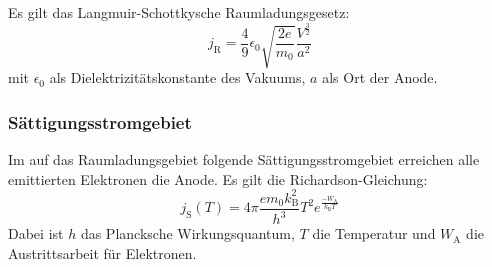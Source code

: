 Es gilt das Langmuir-Schottkysche Raumladungsgesetz:
\begin{equation}
  j_\mathrm{R}=\frac{4}{9} \epsilon_0 \sqrt{\frac{2e}{m_0}}\frac{V^{\frac{3}{2}}}{a^2}
\end{equation}
mit $\epsilon_0$ als Dielektrizitätskonstante des Vakuums, $a$ als Ort der Anode.

\subsubsection{Sättigungsstromgebiet}
Im auf das Raumladungsgebiet folgende Sättigungsstromgebiet erreichen alle emittierten Elektronen die Anode. Es gilt die Richardson-Gleichung:
\begin{equation}
j_\mathrm{S}(T)=4\pi\frac{e m_0 k_\mathrm{B}^2}{h^3}T^2e^{\frac{-W_\mathrm{A}}{k_\mathrm{B}T}}
\end{equation}
Dabei ist $h$ das Plancksche Wirkungsquantum, $T$ die Temperatur und $W_\mathrm{A}$ die Austrittsarbeit für Elektronen.
